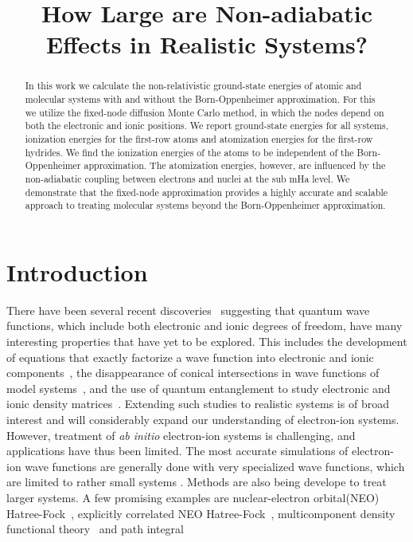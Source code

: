 \documentclass[pra,superscriptaddress,groupedaddress,twocolumn]{revtex4}
\begin{document}
\title{How Large are Non-adiabatic Effects in Realistic Systems?}

\begin{abstract}
In this work we calculate the non-relativistic ground-state energies of atomic and molecular systems with and without the Born-Oppenheimer approximation. For this we utilize the fixed-node diffusion Monte Carlo method, in which the nodes depend on both the electronic and ionic positions. We report ground-state energies for all systems, ionization energies for the first-row atoms and atomization energies for the first-row hydrides. We find the ionization energies of the atoms to be independent of the Born-Oppenheimer approximation. The atomization energies, however, are influenced by the non-adiabatic coupling between electrons and nuclei at the sub mHa level. We demonstrate that the fixed-node approximation provides a highly accurate and scalable approach to treating molecular systems beyond the Born-Oppenheimer approximation.
\end{abstract}
\maketitle

\section{Introduction}
There have been several recent discoveries~\cite{cederbaum1,gross2014,boent,Martinez_Review} suggesting that quantum wave functions, which include both electronic and ionic degrees of freedom, have many interesting properties that have yet to be explored.  This includes the development of equations that exactly factorize a wave function into electronic and ionic components~\cite{cederbaum1}, the disappearance of conical intersections in wave functions of model systems~\cite{gross2014}, and the use of quantum entanglement to study electronic and ionic density matrices~\cite{boent}. Extending such studies to realistic systems is of broad interest and will considerably expand our understanding of electron-ion systems. However, treatment of \textit{ab initio} electron-ion systems is challenging, and applications have thus been limited. The most accurate simulations of electron-ion wave functions are generally done with very specialized wave functions, which are limited to rather small systems \cite{mitroy2013}. Methods are also being develope to treat larger systems. A few promising examples are nuclear-electron orbital(NEO) Hatree-Fock~\cite{Sharon_NEO-HF}, explicitly correlated NEO Hatree-Fock~\cite{Sharon_XCNEO-HF,Sharon_XCNEO-HF1,Sharon_XCNEO-HF2},  multicomponent density functional theory~\cite{Sharon_NEO-DFT,Sharon_NEO-DFT2,Sharon_NEO-DFT3,Gross_NEO-DFT,Gross_NEO-DFT1} and path integral~\cite{Ilkka_Path,Ilkka_Path1,Ilkka_Path2}
\end{document}
